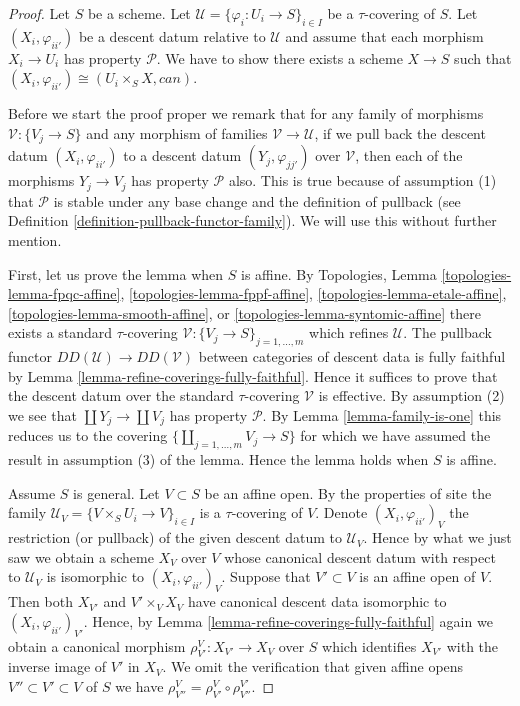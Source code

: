 \begin{proof}
Let $S$ be a scheme.
Let $\mathcal{U} = \{\varphi_i : U_i \to S\}_{i \in I}$
be a $\tau$-covering of $S$.
Let $(X_i, \varphi_{ii'})$ be a descent datum relative to
$\mathcal{U}$ and assume that each morphism $X_i \to U_i$ has property
$\mathcal{P}$. We have to show there exists a scheme $X \to S$ such that
$(X_i, \varphi_{ii'}) \cong (U_i \times_S X, can)$.

\medskip\noindent
Before we start the proof proper we remark that for any
family of morphisms $\mathcal{V} : \{V_j \to S\}$ and any
morphism of families $\mathcal{V} \to \mathcal{U}$, if we pull back
the descent datum $(X_i, \varphi_{ii'})$ to a descent datum
$(Y_j, \varphi_{jj'})$ over $\mathcal{V}$, then each of the
morphisms $Y_j \to V_j$ has property $\mathcal{P}$ also.
This is true because of assumption (1) that $\mathcal{P}$ is stable
under any base change and the definition of pullback
(see Definition \ref{definition-pullback-functor-family}).
We will use this without further mention.

\medskip\noindent
First, let us prove the lemma when $S$ is affine.
By Topologies, Lemma
\ref{topologies-lemma-fpqc-affine},
\ref{topologies-lemma-fppf-affine},
\ref{topologies-lemma-etale-affine},
\ref{topologies-lemma-smooth-affine}, or
\ref{topologies-lemma-syntomic-affine}
there exists a standard $\tau$-covering
$\mathcal{V} : \{V_j \to S\}_{j = 1, \ldots, m}$
which refines $\mathcal{U}$. The pullback functor
$DD(\mathcal{U}) \to DD(\mathcal{V})$
between categories of descent data is fully faithful
by Lemma \ref{lemma-refine-coverings-fully-faithful}.
Hence it suffices to prove that the descent datum over
the standard $\tau$-covering $\mathcal{V}$ is effective.
By assumption (2) we see that $\coprod Y_j \to \coprod V_j$
has property $\mathcal{P}$.
By Lemma \ref{lemma-family-is-one} this reduces us to the covering
$\{\coprod_{j = 1, \ldots, m} V_j \to S\}$ for which we have
assumed the result in assumption (3) of the lemma.
Hence the lemma holds when $S$ is affine.

\medskip\noindent
Assume $S$ is general. Let $V \subset S$ be an affine open.
By the properties of site the family
$\mathcal{U}_V = \{V \times_S U_i \to V\}_{i \in I}$ is a
$\tau$-covering of $V$. Denote
$(X_i, \varphi_{ii'})_V$ the restriction (or pullback) of
the given descent datum to $\mathcal{U}_V$.
Hence by what we just saw we obtain a scheme $X_V$ over $V$
whose canonical descent datum with respect to
$\mathcal{U}_V$ is isomorphic to $(X_i, \varphi_{ii'})_V$.
Suppose that $V' \subset V$ is an affine open of $V$.
Then both $X_{V'}$ and $V' \times_V X_V$ have canonical
descent data isomorphic to $(X_i, \varphi_{ii'})_{V'}$.
Hence, by Lemma \ref{lemma-refine-coverings-fully-faithful}
again we obtain a canonical morphism
$\rho^V_{V'} : X_{V'} \to X_V$ over $S$ which identifies
$X_{V'}$ with the inverse image of $V'$ in $X_V$.
We omit the verification that given affine opens
$V'' \subset V' \subset V$ of $S$ we have
$\rho^V_{V''} = \rho^V_{V'} \circ \rho^{V'}_{V''}$.


\end{proof}
